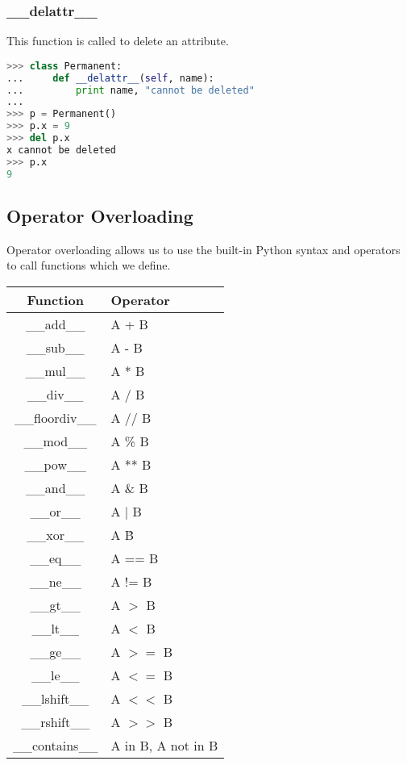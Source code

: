 \subsubsection{\_\_delattr\_\_}
This function is called to delete an attribute.
\lstset{basicstyle=\scriptsize, numbers=left, captionpos=b, tabsize=4}
\begin{lstlisting}[caption=delattr example,language={Python},
xleftmargin=15pt, label=lst:delattrexample]
>>> class Permanent:
...     def __delattr__(self, name):
...         print name, "cannot be deleted"
...
>>> p = Permanent()
>>> p.x = 9
>>> del p.x
x cannot be deleted
>>> p.x
9
\end{lstlisting}

\subsection{Operator Overloading}
Operator overloading allows us to use the built-in Python syntax and operators
to call functions which we define.

\begin{tabular}{|c|p{1.5cm}|}
\hline
Function&Operator \\
\hline
\_\_add\_\_&	A + B \\
\hline
\_\_sub\_\_&	A - B \\
\hline
\_\_mul\_\_&	A * B \\
\hline
\_\_div\_\_&	A / B \\
\hline
\_\_floordiv\_\_&	A // B \\
\hline
\_\_mod\_\_&	A \% B \\
\hline
\_\_pow\_\_&	A ** B \\
\hline
\_\_and\_\_&	A \& B \\
\hline
\_\_or\_\_ & A | B \\
\hline
\_\_xor\_\_&	A \^ B \\
\hline
\_\_eq\_\_&	A == B \\
\hline
\_\_ne\_\_&	A != B \\
\hline
\_\_gt\_\_&	A $>$ B \\
\hline
\_\_lt\_\_&	A $<$ B \\
\hline
\_\_ge\_\_&	A $>=$ B \\
\hline
\_\_le\_\_&	A $<=$ B \\
\hline
\_\_lshift\_\_&	A $<<$ B \\
\hline
\_\_rshift\_\_&	A $>>$ B \\
\hline
\_\_contains\_\_&	A in B, A not in B \\
\hline
\end{tabular}

